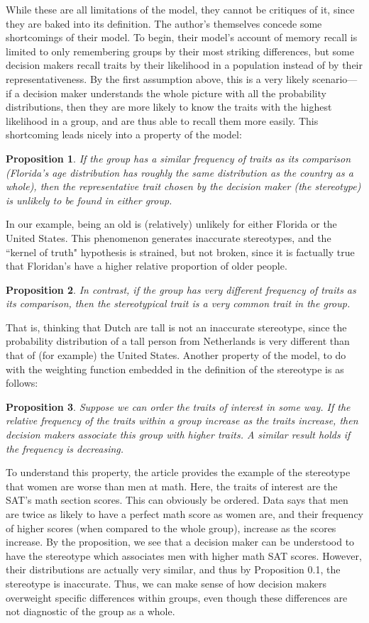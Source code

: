 \documentclass[12pt]{article}
\newtheorem{prop}{Proposition}[section]
\theoremstyle{definition}
\numberwithin{equation}{section}
\begin{document}
\begin{flushleft}
\begin{enumerate}
\end{enumerate}
While these are all limitations of the model, they cannot be critiques of it, since they are baked into its definition. The author's themselves concede some shortcomings of their model. To begin, their model's account of memory recall is limited to only remembering groups by their most striking differences, but some decision makers recall traits by their likelihood in a population instead of by their representativeness. By the first assumption above, this is a very likely scenario--- if a decision maker understands the whole picture with all the probability distributions, then they are more likely to know the traits with the highest likelihood in a group, and are thus able to recall them more easily. This shortcoming leads nicely into a property of the model:
\begin{prop}
    If the group has a similar frequency of traits as its comparison (Florida's age distribution has roughly the same distribution as the country as a whole), then the representative trait chosen by the decision maker (the stereotype) is unlikely to be found in either group.
\end{prop}
    In our example, being an old is (relatively) unlikely for either Florida or the United States. This phenomenon generates inaccurate stereotypes, and the ``kernel of truth" hypothesis is strained, but not broken, since it is factually true that Floridan's have a higher relative proportion of older people. 
    \begin{prop}
    In contrast, if the group has very different frequency of traits as its comparison, then the stereotypical trait is a very common trait in the group. 
\end{prop}
That is, thinking that Dutch are tall is not an inaccurate stereotype, since the probability distribution of a tall person from Netherlands is very different than that of (for example) the United States. Another property of the model, to do with the weighting function embedded in the definition of the stereotype is as follows:
\begin{prop}
    Suppose we can order the traits of interest in some way. If the relative frequency of the traits within a group increase as the traits increase, then decision makers associate this group with higher traits. A similar result holds if the frequency is decreasing.
\end{prop}
To understand this property, the article provides the example of the stereotype that women are worse than men at math. Here, the traits of interest are the SAT's math section scores. This can obviously be ordered. Data says that men are twice as likely to have a perfect math score as women are, and their frequency of higher scores (when compared to the whole group), increase as the scores increase. By the proposition, we see that a decision maker can be understood to have the stereotype which associates men with higher math SAT scores. However, their distributions are actually very similar, and thus by Proposition 0.1, the stereotype is inaccurate. Thus, we can make sense of how decision makers overweight specific differences within groups, even though these differences are not diagnostic of the group as a whole.



\end{flushleft}
\end{document}

